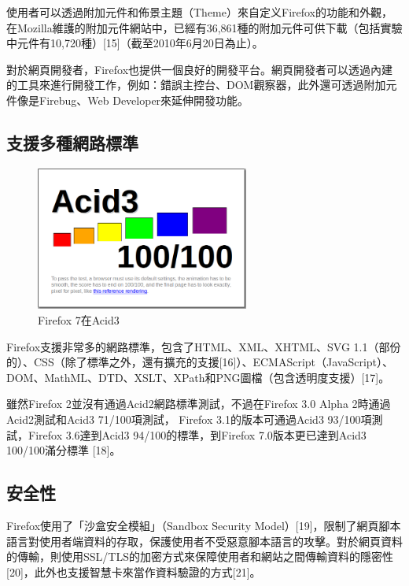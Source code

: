 \documentclass[12pt, a4paper, twoside]{article}
\begin{document}
使用者可以透過附加元件和佈景主題（Theme）來自定义Firefox的功能和外觀，在Mozilla維護的附加元件網站中，已經有36,861種的附加元件可供下載（包括實驗中元件有10,720種）[15]（截至2010年6月20日為止）。

對於網頁開發者，Firefox也提供一個良好的開發平台。網頁開發者可以透過內建的工具來進行開發工作，例如：錯誤主控台、DOM觀察器，此外還可透過附加元件像是Firebug、Web Developer來延伸開發功能。

\subsection{支援多種網路標準}

\begin{figure}
\centering
\includegraphics[width=70mm]{Firefox_7_Acid_3_Result}
\caption{Firefox 7在Acid3\protect{}\protect\footnotemark}
\end{figure}
\addtocounter{footnote}{-2}

Firefox支援非常多的網路標準，包含了HTML、XML、XHTML、SVG 1.1（部份的）、CSS（除了標準之外，還有擴充的支援[16]）、ECMAScript（JavaScript）、DOM、MathML、DTD、XSLT、XPath和PNG圖檔（包含透明度支援）[17]。

雖然Firefox 2並沒有通過Acid2網路標準測試，不過在Firefox 3.0 Alpha 2時通過Acid2測試和Acid3 71/100項測試， Firefox 3.1的版本可通過Acid3 93/100項測試，Firefox 3.6達到Acid3 94/100的標準，到Firefox 7.0版本更已達到Acid3 100/100滿分標準 [18]。

\subsection{安全性}

Firefox使用了「沙盒安全模組」（Sandbox Security Model）[19]，限制了網頁腳本語言對使用者端資料的存取，保護使用者不受惡意腳本語言的攻擊。對於網頁資料的傳輸，則使用SSL/TLS的加密方式來保障使用者和網站之間傳輸資料的隱密性[20]，此外也支援智慧卡來當作資料驗證的方式[21]。
\end{document}
